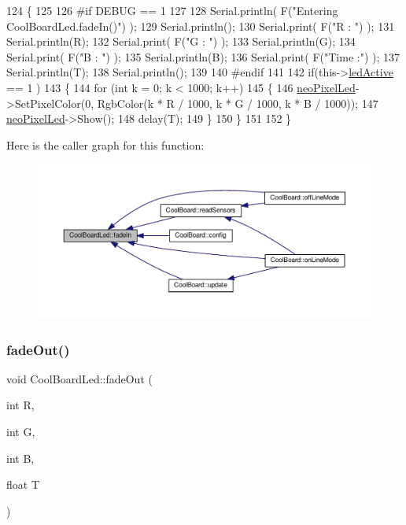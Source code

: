 \begin{DoxyCode}
124 \{
125 
126 \textcolor{preprocessor}{#if DEBUG == 1}
127 
128     Serial.println( F(\textcolor{stringliteral}{"Entering CoolBoardLed.fadeIn()"}) );
129     Serial.println();
130     Serial.print( F(\textcolor{stringliteral}{"R : "}) );
131     Serial.println(R);
132     Serial.print( F(\textcolor{stringliteral}{"G : "}) );
133     Serial.println(G);
134     Serial.print( F(\textcolor{stringliteral}{"B : "}) );
135     Serial.println(B);
136     Serial.print( F(\textcolor{stringliteral}{"Time :"}) );
137     Serial.println(T);
138     Serial.println();
139 
140 \textcolor{preprocessor}{#endif  }
141     
142     \textcolor{keywordflow}{if}(this->\hyperlink{class_cool_board_led_aadd04d2ecf123247718d77f42fba7f08}{ledActive} == 1 )
143     \{
144         \textcolor{keywordflow}{for} (\textcolor{keywordtype}{int} k = 0; k < 1000; k++) 
145         \{
146             \hyperlink{class_cool_board_led_ac2c13fa462a010cd9242bf297c013923}{neoPixelLed}->SetPixelColor(0, RgbColor(k * R / 1000, k * G / 1000, k * B / 1000));
147             \hyperlink{class_cool_board_led_ac2c13fa462a010cd9242bf297c013923}{neoPixelLed}->Show();
148             delay(T);
149         \}
150     \}
151 
152 \}
\end{DoxyCode}
Here is the caller graph for this function\+:\nopagebreak
\begin{figure}[H]
\begin{center}
\leavevmode
\includegraphics[width=350pt]{de/dc0/class_cool_board_led_ab778f5e7bed0ab74e3906d82110493c3_icgraph}
\end{center}
\end{figure}
\mbox{\label{class_cool_board_led_a93d545679237e8cc858324367149775c}} 
\subsubsection{\texorpdfstring{fade\+Out()}{fadeOut()}}
{\footnotesize\ttfamily void Cool\+Board\+Led\+::fade\+Out (\begin{DoxyParamCaption}\item[{int}]{R,  }\item[{int}]{G,  }\item[{int}]{B,  }\item[{float}]{T }\end{DoxyParamCaption})}

